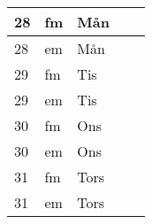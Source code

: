 \documentclass[a4paper]{article}
\begin{document}
\begin{table}[ht!]
\begin{tabular}{lllp{7cm}p{7cm}}
\multicolumn{1}{|l|}{28} & \multicolumn{1}{l|}{fm} & \multicolumn{1}{l|}{Mån} & \multicolumn{1}{l|}{} & \multicolumn{1}{l|}{} \\ \hline
\multicolumn{1}{|l|}{28} & \multicolumn{1}{l|}{em} & \multicolumn{1}{l|}{Mån} & \multicolumn{1}{l|}{} & \multicolumn{1}{l|}{} \\ \hline    

\multicolumn{1}{|l|}{29} & \multicolumn{1}{l|}{fm} & \multicolumn{1}{l|}{Tis} & \multicolumn{1}{l|}{} & \multicolumn{1}{l|}{} \\ \hline
\multicolumn{1}{|l|}{29} & \multicolumn{1}{l|}{em} & \multicolumn{1}{l|}{Tis} & \multicolumn{1}{l|}{} & \multicolumn{1}{l|}{} \\ \hline    

\multicolumn{1}{|l|}{30} & \multicolumn{1}{l|}{fm} & \multicolumn{1}{l|}{Ons} & \multicolumn{1}{l|}{} & \multicolumn{1}{l|}{} \\ \hline
\multicolumn{1}{|l|}{30} & \multicolumn{1}{l|}{em} & \multicolumn{1}{l|}{Ons} & \multicolumn{1}{l|}{} & \multicolumn{1}{l|}{} \\ \hline    

\multicolumn{1}{|l|}{31} & \multicolumn{1}{l|}{fm} & \multicolumn{1}{l|}{Tors} & \multicolumn{1}{l|}{} & \multicolumn{1}{l|}{} \\ \hline
\multicolumn{1}{|l|}{31} & \multicolumn{1}{l|}{em} & \multicolumn{1}{l|}{Tors} & \multicolumn{1}{l|}{} & \multicolumn{1}{l|}{} \\ \hline    

    \end{tabular}
    \end{table}
    
\end{document}

